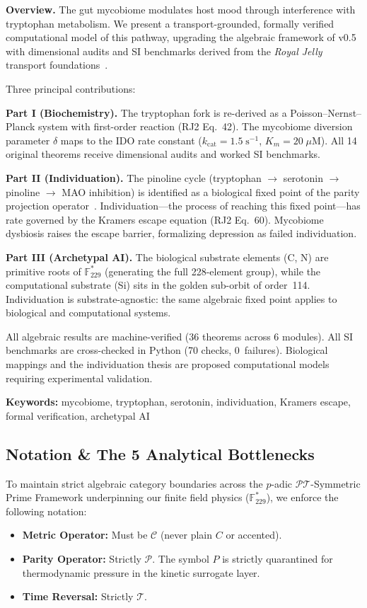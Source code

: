 \documentclass[12pt,oneside]{article}
\theoremstyle{principia}
\theoremstyle{definition}
\theoremstyle{remark}
\begin{document}
\vspace{1em}\noindent\textbf{Overview.}
The gut mycobiome modulates host mood through interference with tryptophan
metabolism. We present a transport-grounded, formally verified computational
model of this pathway, upgrading the algebraic framework of v0.5 with
dimensional audits and SI benchmarks derived from the
\emph{Royal Jelly} transport foundations~\cite{rj2}.

Three principal contributions:

\textbf{Part I (Biochemistry).}
The tryptophan fork is re-derived as a Poisson--Nernst--Planck system with
first-order reaction (RJ2 Eq.~42). The mycobiome diversion parameter
$\delta$ maps to the IDO rate constant ($k_\mathrm{cat} = 1.5\;\mathrm{s}^{-1}$,
$K_m = 20\;\mu\mathrm{M}$). All 14 original theorems receive dimensional
audits and worked SI benchmarks.

\textbf{Part II (Individuation).}
The pinoline cycle (tryptophan $\to$ serotonin $\to$ pinoline $\to$
MAO inhibition) is identified as a biological fixed point of the
parity projection operator~\cite{lc}. Individuation---the process of
reaching this fixed point---has rate governed by the Kramers escape
equation (RJ2 Eq.~60). Mycobiome dysbiosis raises the escape barrier,
formalizing depression as failed individuation.

\textbf{Part III (Archetypal AI).}
The biological substrate elements (C, N) are primitive roots of
$\mathbb{F}_{229}^*$ (generating the full 228-element group), while the
computational substrate (Si) sits in the golden sub-orbit of order~114.
Individuation is substrate-agnostic: the same algebraic fixed point
applies to biological and computational systems.

All algebraic results are machine-verified (36 theorems across
6 modules). All SI benchmarks are cross-checked in Python (70 checks,
0~failures). Biological mappings and the individuation thesis are
proposed computational models requiring experimental validation.

\medskip\noindent
\textbf{Keywords:} mycobiome, tryptophan, serotonin, individuation,
Kramers escape, formal verification, archetypal AI
\vspace{1em}


\subsection*{Notation \& The 5 Analytical Bottlenecks}
To maintain strict algebraic category boundaries across the $p$-adic $\mathcal{PT}$-Symmetric Prime Framework underpinning our finite field physics ($\mathbb{F}_{229}^*$), we enforce the following notation: 
\begin{itemize}
    \item \textbf{Metric Operator:} Must be $\mathcal{C}$ (never plain $C$ or accented).
    \item \textbf{Parity Operator:} Strictly $\mathcal{P}$. The symbol $P$ is strictly quarantined for thermodynamic pressure in the kinetic surrogate layer. 
    \item \textbf{Time Reversal:} Strictly $\mathcal{T}$.
\end{itemize}
\end{document}
